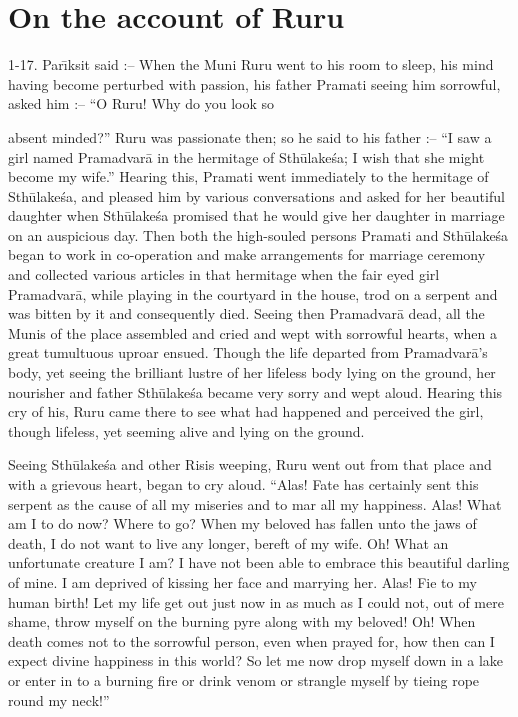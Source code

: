 \chapter{On the account of Ruru}

1-17. Par\={\i}ksit said :-- When the Muni Ruru went to his room to sleep, his mind having become perturbed with passion, his father Pramati seeing him sorrowful, asked him :-- ``O Ruru! Why do you look so

absent minded?'' Ruru was passionate then; so he said to his father :-- ``I saw a girl named Pramadvar\=a in the hermitage of Sth\=ulake\'sa; I wish that she might become my wife.'' Hearing this, Pramati went immediately to the hermitage of Sth\=ulake\'sa, and pleased him by various conversations and asked for her beautiful daughter when Sth\=ulake\'sa promised that he would give her daughter in marriage on an auspicious day. Then both the high-souled persons Pramati and Sth\=ulake\'sa began to work in co-operation and make arrangements for marriage ceremony and collected various articles in that hermitage when the fair eyed girl Pramadvar\=a, while playing in the courtyard in the house, trod on a serpent and was bitten by it and consequently died. Seeing then Pramadvar\=a dead, all the Munis of the place assembled and cried and wept with sorrowful hearts, when a great tumultuous uproar ensued. Though the life departed from Pramadvar\=a's body, yet seeing the brilliant lustre of her lifeless body lying on the ground, her nourisher and father Sth\=ulake\'sa became very sorry and wept aloud. Hearing this cry of his, Ruru came there to see what had happened and perceived the girl, though lifeless, yet seeming alive and lying on the ground.

Seeing Sth\=ulake\'sa and other Risis weeping, Ruru went out from that place and with a grievous heart, began to cry aloud. ``Alas! Fate has certainly sent this serpent as the cause of all my miseries and to mar all my happiness. Alas! What am I to do now? Where to go? When my beloved has fallen unto the jaws of death, I do not want to live any longer, bereft of my wife. Oh! What an unfortunate creature I am? I have not been able to embrace this beautiful darling of mine. I am deprived of kissing her face and marrying her. Alas! Fie to my human birth! Let my life get out just now in as much as I could not, out of mere shame, throw myself on the burning pyre along with my beloved! Oh! When death comes not to the sorrowful person, even when prayed for, how then can I expect divine happiness in this world? So let me now drop myself down in a lake or enter in to a burning fire or drink venom or strangle myself by tieing rope round my neck!''

